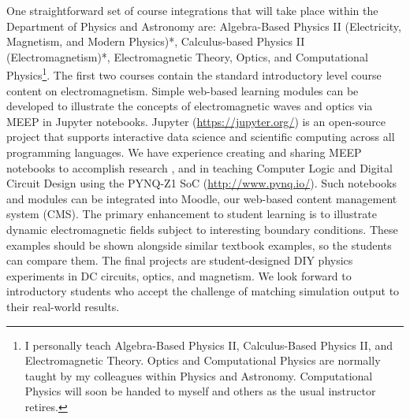 \documentclass[../../main.tex]{subfiles}
\begin{document}
One straightforward set of course integrations that will take place within the Department of Physics and Astronomy are: Algebra-Based Physics II (Electricity, Magnetism, and Modern Physics)*, Calculus-based Physics II (Electromagnetism)*, Electromagnetic Theory, Optics, and Computational Physics\footnote{I personally teach Algebra-Based Physics II, Calculus-Based Physics II, and Electromagnetic Theory.  Optics and Computational Physics are normally taught by my colleagues within Physics and Astronomy.  Computational Physics will soon be handed to myself and others as the usual instructor retires.}.  The first two courses contain the standard introductory level course content on electromagnetism.  Simple web-based learning modules can be developed to illustrate the concepts of electromagnetic waves and optics via MEEP in Jupyter notebooks.  Jupyter (\url{https://jupyter.org/}) is an open-source project that supports interactive data science and scientific computing across all programming languages.  We have experience creating and sharing MEEP notebooks to accomplish research \cite{electronics10040415}, and in teaching Computer Logic and Digital Circuit Design using the PYNQ-Z1 SoC (\url{http://www.pynq.io/}). Such notebooks and modules can be integrated into Moodle, our web-based content management system (CMS).  The primary enhancement to student learning is to illustrate dynamic electromagnetic fields subject to interesting boundary conditions.  These examples should be shown alongside similar textbook examples, so the students can compare them.  The final projects are student-designed DIY physics experiments in DC circuits, optics, and magnetism.  We look forward to introductory students who accept the challenge of matching simulation output to their real-world results. \\ \vspace{2.5mm}
\end{document}
